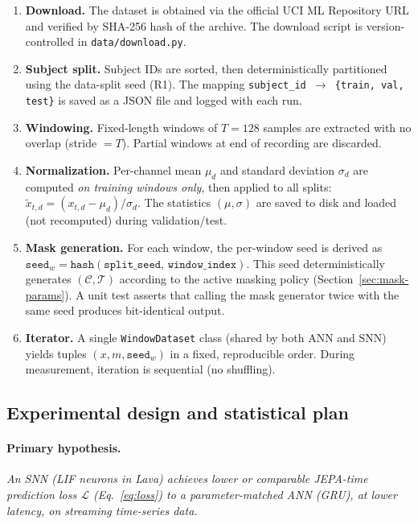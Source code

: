 \documentclass[11pt,a4paper]{article}
\begin{document}
\begin{enumerate}[nosep,label=\textbf{D\arabic*.}]
\item \textbf{Download.}
  The dataset is obtained via the official UCI ML Repository URL and
  verified by SHA-256 hash of the archive.  The download script is
  version-controlled in \texttt{data/download.py}.
\item \textbf{Subject split.}
  Subject IDs are sorted, then deterministically partitioned using the
  data-split seed (R1).  The mapping
  \texttt{subject\_id $\to$ \{train, val, test\}} is saved as a JSON
  file and logged with each run.
\item \textbf{Windowing.}
  Fixed-length windows of $T=128$ samples are extracted with no overlap
  (stride $=T$).  Partial windows at end of recording are discarded.
\item \textbf{Normalization.}
  Per-channel mean $\mu_d$ and standard deviation $\sigma_d$ are computed
  \emph{on training windows only}, then applied to all splits:
  $\tilde{x}_{t,d} = (x_{t,d} - \mu_d)/\sigma_d$.  The statistics
  $(\mu, \sigma)$ are saved to disk and loaded (not recomputed) during
  validation/test.
\item \textbf{Mask generation.}
  For each window, the per-window seed is derived as
  $\texttt{seed}_w = \texttt{hash}(\texttt{split\_seed},\,
  \texttt{window\_index})$.  This seed deterministically generates
  $(\mathcal{C}, \mathcal{T})$ according to the active masking policy
  (Section~\ref{sec:mask-params}).  A unit test asserts that calling the
  mask generator twice with the same seed produces bit-identical output.
\item \textbf{Iterator.}
  A single \texttt{WindowDataset} class (shared by both ANN and SNN)
  yields tuples $(x, m, \texttt{seed}_w)$ in a fixed, reproducible
  order.  During measurement, iteration is sequential (no shuffling).
\end{enumerate}

\subsection{Experimental design and statistical plan}%
\label{sec:exp-design}

\paragraph{Primary hypothesis.}
\emph{An SNN (LIF neurons in Lava) achieves lower or comparable
JEPA-time prediction loss
$\mathcal{L}$ (Eq.~\ref{eq:loss}) to a parameter-matched ANN
(GRU), at lower latency, on streaming time-series data.}
\end{document}
